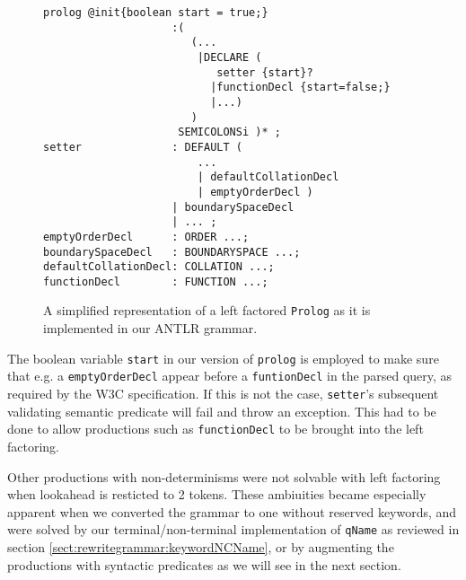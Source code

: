 \begin{figure}[h!]
\begin{Verbatim}
prolog @init{boolean start = true;}
                    :(
                       (...
                        |DECLARE (
                           setter {start}?
                          |functionDecl {start=false;}
                          |...)
                       )
                     SEMICOLONSi )* ;
setter              : DEFAULT (
                        ...
                        | defaultCollationDecl
                        | emptyOrderDecl )
                    | boundarySpaceDecl
                    | ... ;
emptyOrderDecl      : ORDER ...;
boundarySpaceDecl   : BOUNDARYSPACE ...;
defaultCollationDecl: COLLATION ...;
functionDecl        : FUNCTION ...;
\end{Verbatim}
\label{fig:antlrFactored}
\caption[\texttt{Prolog} left factored.]{A simplified representation of a left factored \texttt{Prolog} as it is implemented in our ANTLR grammar.}
\end{figure}

The boolean variable \verb!start! in our version of \verb!prolog! is employed to make sure that e.g. a \verb!emptyOrderDecl! appear before a \verb!funtionDecl! in the parsed query, as required by the W3C specification. If this is not the case, \verb!setter!'s subsequent validating semantic predicate will fail and throw an exception. This had to be done to allow productions such as \verb!functionDecl! to be brought into the left factoring.

Other productions with non-determinisms were not solvable with left factoring when lookahead is resticted to 2 tokens. These ambiuities became especially apparent when we converted the grammar to one without reserved keywords, and were solved by our terminal/non-terminal implementation of \verb!qName! as reviewed in section \ref{sect:rewritegrammar:keywordNCName}, or by augmenting the productions with syntactic predicates as we will see in the next section.
